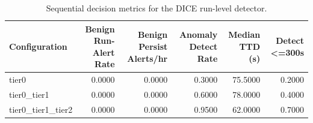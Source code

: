 \begin{table}[t]
\centering
\caption{Sequential decision metrics for the DICE run-level detector.}
\label{tab:dice_sequential_metrics}
\footnotesize
\begin{tabular}{lrrrrr}
\toprule
Configuration & Benign Run-Alert Rate & Benign Persist Alerts/hr & Anomaly Detect Rate & Median TTD (s) & Detect <=300s \\
\midrule
tier0 & 0.0000 & 0.0000 & 0.3000 & 75.5000 & 0.2000 \\
tier0_tier1 & 0.0000 & 0.0000 & 0.6000 & 78.0000 & 0.4000 \\
tier0_tier1_tier2 & 0.0000 & 0.0000 & 0.9500 & 62.0000 & 0.7000 \\
\bottomrule
\end{tabular}

\end{table}
